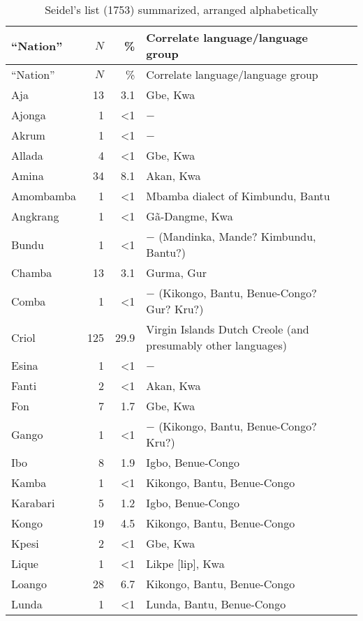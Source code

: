 \documentclass[output=paper,colorlinks,citecolor=brown]{langscibook}
\begin{document}
\begin{longtable}{lrrp{7cm}l}
\caption{Seidel’s list (1753) summarized, arranged alphabetically}\label{tab:tab6_02}\\
    \lsptoprule
    {``Nation''} & {$N$} & {\%} & {Correlate language/language group} \\ \midrule\endfirsthead
    \midrule
    {``Nation''} & {$N$} & {\%} & {Correlate language/language group} \\ \midrule\endhead 
    \endfoot\lspbottomrule\endlastfoot
    Aja & 13 & 3.1 & Gbe, Kwa \\
    Ajonga & 1 & \textless{}1 & − \\
    Akrum & 1 & \textless{}1 & − \\
    Allada & 4 & \textless{}1 & Gbe, Kwa \\
    Amina & 34 & 8.1 & Akan, Kwa \\
    Amombamba & 1 & \textless{}1 & Mbamba dialect of Kimbundu, Bantu \\
    Angkrang & 1 & \textless{}1 & G\~a-Dangme, Kwa \\
    Bundu & 1 & \textless{}1 & − (Mandinka, Mande? Kimbundu, Bantu?) \\
    Chamba & 13 & 3.1 & Gurma, Gur \\
    Comba & 1 & \textless{}1 & − (Kikongo, Bantu, Benue-Congo? Gur? Kru?) \\
    Criol & 125 & 29.9 & Virgin Islands Dutch Creole (and presumably other languages) \\
    Esina & 1 & \textless{}1 & − \\
    Fanti & 2 & \textless{}1 & Akan, Kwa \\ 
    Fon & 7 & 1.7 & Gbe, Kwa \\ 
    Gango & 1 & \textless{}1 & − (Kikongo, Bantu, Benue-Congo? Kru?) \\
    Ibo & 8 & 1.9 & Igbo, Benue-Congo \\
    Kamba & 1 & \textless{}1 & Kikongo, Bantu, Benue-Congo \\
    Karabari & 5 & 1.2 & Igbo, Benue-Congo \\
    Kongo & 19 & 4.5 & Kikongo, Bantu, Benue-Congo \\
    Kpesi & 2 & \textless{}1 & Gbe, Kwa \\
    Lique & 1 & \textless{}1 & Likpe {[}lip{]}, Kwa \\
    Loango & 28 & 6.7 & Kikongo, Bantu, Benue-Congo \\
    Lunda & 1 & \textless{}1 & Lunda, Bantu, Benue-Congo \\

\end{longtable}
\end{document}
